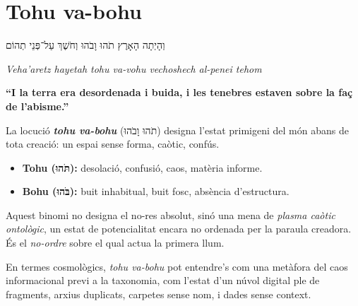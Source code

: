 \section*{Tohu va-bohu}


\begin{quoting}
\texthebrew{וְהָיְתָה הָאָרֶץ תֹהוּ וָבֹהוּ וְחֹשֶׁךְ עַל־פְּנֵי תְהוֹם}

\vspace{1em}

\textit{Veha’aretz hayetah tohu va-vohu vechoshech al-penei tehom}

\vspace{1em}

\textbf{“I la terra era desordenada i buida, i les tenebres estaven sobre la faç de l’abisme.”}
\end{quoting}

\medskip

\noindent
La locució \textbf{\textit{tohu va-bohu}} (\texthebrew{תֹהוּ וָבֹהוּ}) designa l’estat primigeni del món abans de tota creació: un espai sense forma, caòtic, confús.

\begin{itemize}
    \item \textbf{Tohu (\texthebrew{תֹּהוּ}):} desolació, confusió, caos, matèria informe.
    \item \textbf{Bohu (\texthebrew{בֹּהוּ}):} buit inhabitual, buit fosc, absència d’estructura.
\end{itemize}

\noindent
Aquest binomi no designa el no-res absolut, sinó una mena de \textit{plasma caòtic ontològic}, un estat de potencialitat encara no ordenada per la paraula creadora. És el \textit{no-ordre} sobre el qual actua la primera llum.

\bigskip

\noindent
En termes cosmològics, \textit{tohu va-bohu} pot entendre’s com una metàfora del caos informacional previ a la taxonomia, com l’estat d’un núvol digital ple de fragments, arxius duplicats, carpetes sense nom, i dades sense context.